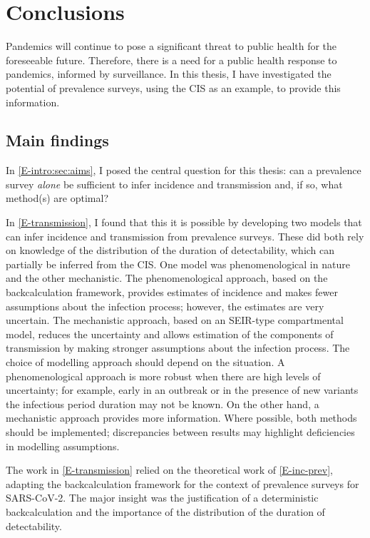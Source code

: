 \documentclass[thesis.tex]{subfiles}
\begin{document}
\ifSubfilesClassLoaded{
    \setcounter{chapter}{7}
}

\chapter{Conclusions} \label{conclusion}

Pandemics will continue to pose a significant threat to public health for the foreseeable future.
Therefore, there is a need for a public health response to pandemics, informed by surveillance.
In this thesis, I have investigated the potential of prevalence surveys, using the CIS as an example, to provide this information.

\section{Main findings}

In \cref{E-intro:sec:aims}, I posed the central question for this thesis: can a prevalence survey \emph{alone} be sufficient to infer incidence and transmission and, if so, what method(s) are optimal?

In \cref{E-transmission}, I found that this it is possible by developing two models that can infer incidence and transmission from prevalence surveys.
These did both rely on knowledge of the distribution of the duration of detectability, which can partially be inferred from the CIS.
One model was phenomenological in nature and the other mechanistic.
The phenomenological approach, based on the backcalculation framework, provides estimates of incidence and makes fewer assumptions about the infection process; however, the estimates are very uncertain.
The mechanistic approach, based on an SEIR-type compartmental model, reduces the uncertainty and allows estimation of the components of transmission by making stronger assumptions about the infection process.
The choice of modelling approach should depend on the situation.
A phenomenological approach is more robust when there are high levels of uncertainty; for example, early in an outbreak or in the presence of new variants the infectious period duration may not be known.
On the other hand, a mechanistic approach provides more information.
Where possible, both methods should be implemented; discrepancies between results may highlight deficiencies in modelling assumptions.

The work in \cref{E-transmission} relied on the theoretical work of \cref{E-inc-prev}, adapting the backcalculation framework for the context of prevalence surveys for SARS-CoV-2.
The major insight was the justification of a deterministic backcalculation and the importance of the distribution of the duration of detectability.
\end{document}
